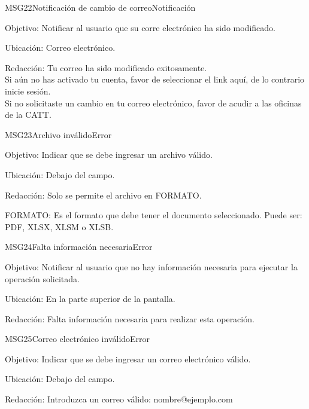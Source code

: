 \begin{mensaje}{MSG22}{Notificación de cambio de correo}{Notificación}
	\item[Objetivo:] Notificar al usuario que su corre electrónico ha sido modificado.
	\item[Ubicación:] Correo electrónico.
	\item[Redacción:] Tu correo  ha sido modificado exitosamente.\\
	Si aún no has activado tu cuenta, favor de seleccionar el link aquí, de lo contrario inicie sesión.\\
	Si no solicitaste un cambio en tu correo electrónico, favor de acudir a las oficinas de la CATT.
\end{mensaje}

\begin{mensaje}{MSG23}{Archivo inválido}{Error}
	\item[Objetivo:] Indicar que se debe ingresar un archivo válido.
    \item[Ubicación:] Debajo del campo.
    \item[Redacción:] Solo se permite el archivo en FORMATO.
    \begin{Citemize}
    	\item FORMATO: Es el formato que debe tener el documento seleccionado. Puede ser: PDF, XLSX, XLSM o XLSB.
    \end{Citemize}
\end{mensaje}

\begin{mensaje}{MSG24}{Falta información necesaria}{Error}
	\item[Objetivo:] Notificar al usuario que no hay información necesaria para ejecutar la operación solicitada.
    \item[Ubicación:] En la parte superior de la pantalla.
    \item[Redacción:] Falta información necesaria para realizar esta operación.
\end{mensaje}

\begin{mensaje}{MSG25}{Correo electrónico inválido}{Error}
	\item[Objetivo:] Indicar que se debe ingresar un correo electrónico válido.
    \item[Ubicación:] Debajo del campo.
    \item[Redacción:] Introduzca un correo válido: nombre@ejemplo.com
\end{mensaje}

